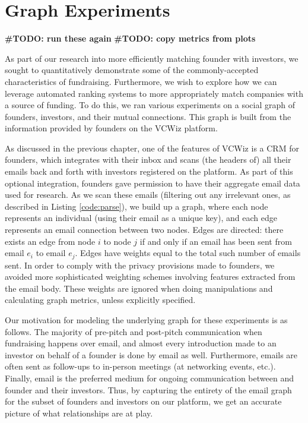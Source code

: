\chapter{Graph Experiments}

\textbf{\#TODO: run these again}
\textbf{\#TODO: copy metrics from plots}

As part of our research into more efficiently matching founder with investors, we sought to quantitatively demonstrate some of the commonly-accepted characteristics of fundraising. Furthermore, we wish to explore how we can leverage automated ranking systems to more appropriately match companies with a source of funding. To do this, we ran various experiments on a social graph of founders, investors, and their mutual connections. This graph is built from the information provided by founders on the VCWiz platform.

As discussed in the previous chapter, one of the features of VCWiz is a CRM for founders, which integrates with their inbox and scans (the headers of) all their emails back and forth with investors registered on the platform. As part of this optional integration, founders gave permission to have their aggregate email data used for research. As we scan these emails (filtering out any irrelevant ones, as described in Listing \ref{code:parse}), we build up a graph, where each node represents an individual (using their email as a unique key), and each edge represents an email connection between two nodes. Edges are directed: there exists an edge from node $i$ to node $j$ if and only if an email has been sent from email $e_i$ to email $e_j$. Edges have weights equal to the total such number of emails sent. In order to comply with the privacy provisions made to founders, we avoided more sophisticated weighting schemes involving features extracted from the email body. These weights are ignored when doing manipulations and calculating graph metrics, unless explicitly specified.

Our motivation for modeling the underlying graph for these experiments is as follows. The majority of pre-pitch and post-pitch communication when fundraising happens over email, and almost every introduction made to an investor on behalf of a founder is done by email as well. Furthermore, emails are often sent as follow-ups to in-person meetings (at networking events, etc.). Finally, email is the preferred medium for ongoing communication between and founder and their investors. Thus, by capturing the entirety of the email graph for the subset of founders and investors on our platform, we get an accurate picture of what relationships are at play.

